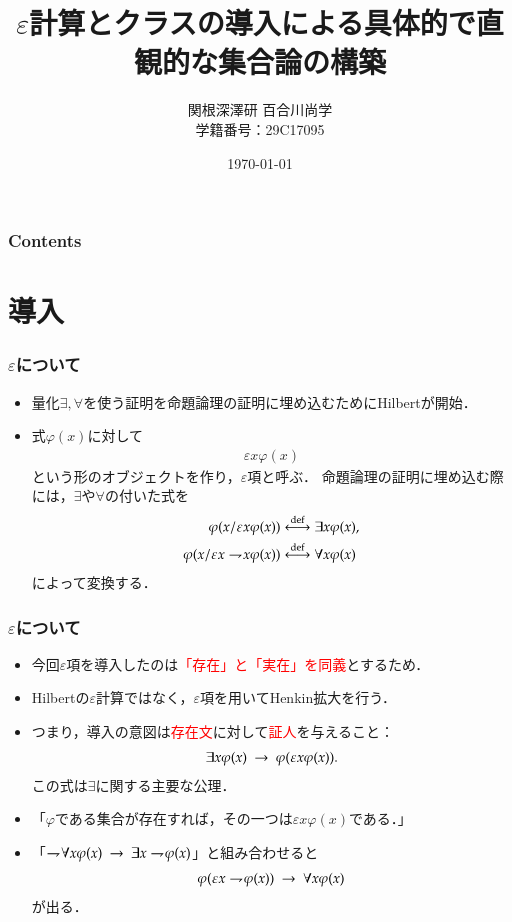 \documentclass[dvipdfmx,10pt,notheorems]{beamer}
\title{$\varepsilon$計算とクラスの導入による具体的で直観的な集合論の構築}%
\author{関根深澤研 百合川尚学 \\ 学籍番号：29C17095}%
\institute{}%
\date{\today}%
\theoremstyle{definition}
\newcommand{\defarrow}{\overset{\mathrm{def}}{\longleftrightarrow}} %
\newcommand{\negation}{\rightharpoondown\hspace{-0.25em}} %
\newcommand{\rarrow}{\hspace{0.25em}\rightarrow\hspace{0.25em}} %
\begin{document}

\begin{frame}[plain]\frametitle{}
\titlepage %
\end{frame}

\begin{frame}\frametitle{Contents}
\tableofcontents %
\end{frame}

\section{導入}

\begin{frame}\frametitle{$\varepsilon$について}
	\begin{itemize}
		\item 量化$\exists,\forall$を使う証明を命題論理の証明に埋め込むためにHilbertが開始．
		
		\item 式$\varphi(x)$に対して
			\begin{align}
				\varepsilon x \varphi(x)
			\end{align}
			という形のオブジェクトを作り，$\varepsilon$項と呼ぶ．
			命題論理の証明に埋め込む際には，$\exists$や$\forall$の付いた式を
			\begin{align}
				\varphi(x/\varepsilon x \varphi(x)) &\defarrow \exists x \varphi(x), \\
				\varphi(x/\varepsilon x \negation x \varphi(x)) &\defarrow \forall x \varphi(x)
			\end{align}
			によって変換する．
	\end{itemize}
\end{frame}

\begin{frame}\frametitle{$\varepsilon$について}
	\begin{itemize}
		\item 今回$\varepsilon$項を導入したのは\textcolor{red}{「存在」と「実在」を同義}とするため．
		
		\item Hilbertの$\varepsilon$計算ではなく，$\varepsilon$項を用いてHenkin拡大を行う． 
			
		\item つまり，導入の意図は\textcolor{red}{存在文}に対して\textcolor{red}{証人}を与えること：
			\begin{align}
				\exists x \varphi(x) \rarrow \varphi(\varepsilon x \varphi(x)).
			\end{align}
			この式は$\exists$に関する主要な公理．
			
		\item 「$\varphi$である集合が存在すれば，その一つは$\varepsilon x \varphi(x)$である．」
		
		\item 「$\negation \forall x \varphi(x) \rarrow \exists x \negation \varphi(x)$」と組み合わせると
			\begin{align}
				\varphi(\varepsilon x \negation \varphi(x)) \rarrow \forall x \varphi(x)
			\end{align}
			が出る．
	\end{itemize}
\end{frame}
\end{document}
